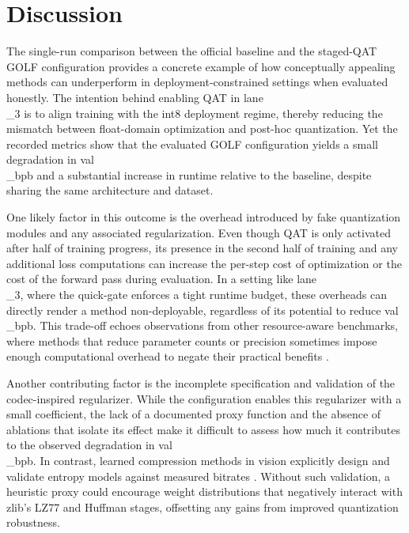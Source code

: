 \documentclass{article}
\begin{document}
\section{Discussion}

\label{sec:discussion}

The single-run comparison between the official baseline and the staged-QAT GOLF configuration provides a concrete example of how conceptually appealing methods can underperform in deployment-constrained settings when evaluated honestly. The intention behind enabling QAT in lane\\_3 is to align training with the int8 deployment regime, thereby reducing the mismatch between float-domain optimization and post-hoc quantization. Yet the recorded metrics show that the evaluated GOLF configuration yields a small degradation in val\\_bpb and a substantial increase in runtime relative to the baseline, despite sharing the same architecture and dataset.

One likely factor in this outcome is the overhead introduced by fake quantization modules and any associated regularization. Even though QAT is only activated after half of training progress, its presence in the second half of training and any additional loss computations can increase the per-step cost of optimization or the cost of the forward pass during evaluation. In a setting like lane\\_3, where the quick-gate enforces a tight runtime budget, these overheads can directly render a method non-deployable, regardless of its potential to reduce val\\_bpb. This trade-off echoes observations from other resource-aware benchmarks, where methods that reduce parameter counts or precision sometimes impose enough computational overhead to negate their practical benefits \cite{banbury2021mlperf, desislavov2021compute}.

Another contributing factor is the incomplete specification and validation of the codec-inspired regularizer. While the configuration enables this regularizer with a small coefficient, the lack of a documented proxy function and the absence of ablations that isolate its effect make it difficult to assess how much it contributes to the observed degradation in val\\_bpb. In contrast, learned compression methods in vision explicitly design and validate entropy models against measured bitrates \cite{balle2017end, minnen2018joint}. Without such validation, a heuristic proxy could encourage weight distributions that negatively interact with zlib's LZ77 and Huffman stages, offsetting any gains from improved quantization robustness.
\end{document}
